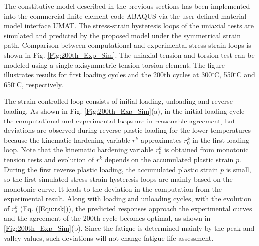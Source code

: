 \documentclass[preprint,5p,twocolumn,11pt,sort&compress]{elsarticle}
\begin{document}
\begin{figure*}
\caption{Comparison of the stress-strain hysteresis loops from experiments and computations  under isothermal uniaxial tensile loading conditions at 300$^{\circ}$C, 550$^{\circ}$C and 650$^{\circ}$C, respectively. (a) The first loading cycle. (b) The 200th. cycle.}
\label{Fig:200th_Exp_Sim}
\end{figure*}

\noindent
The constitutive model described in the previous sections has been implemented into the commercial finite element code  ABAQUS via the user-defined material model interface UMAT. 
The stress-strain hysteresis loops of the uniaxial tests are simulated and predicted by the proposed model under the symmetrical strain path.
Comparison between computational and experimental stress-strain loops is shown in Fig. \ref{Fig:200th_Exp_Sim}. The uniaxial tension and torsion test can be modeled using a single axisymmetric tension-torsion element.
The figure illustrates results for first loading cycles and the 200th cycles at 300$^{\circ}$C, 550$^{\circ}$C and 650$^{\circ}$C, respectively.

The strain controlled loop consists of initial loading, unloading and reverse loading.
As shown in Fig. \ref{Fig:200th_Exp_Sim}(a), in the initial loading cycle the computational and experimental loops are in reasonable agreement, but deviations are observed during reverse plastic loading for the lower temperatures because the kinematic hardening variable $r^k$ approximates ${r_0^k}$ in the first loading loop.
Note that the kinematic hardening variable ${r_0^k}$ is obtained from monotonic tension tests and evolution of $r^k$ depends on the accumulated plastic strain $p$.
During the first reverse plastic loading, the accumulated plastic strain $p$ is small, so the first simulated stress-strain hysteresis loops are mainly based on the monotonic curve. It leads to the deviation in the computation from the experimental result.
Along with loading and unloading cycles, with the evolution of $r_s^k$ (Eq. (\ref{Equ:rsk})), the predicted responses approach the experimental curves and the agreement of the 200th cycle becomes optimal, as shown in \ref{Fig:200th_Exp_Sim}(b). Since the fatigue is determined mainly by the peak and valley values, such deviations will not change fatigue life assessment.
\end{document}
